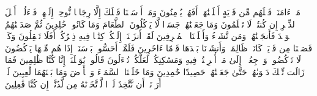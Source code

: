 \stopbuffer%
\startbuffer[\q:21:6]
مَاۤ ءَامَنَتۡ قَبۡلَهُم مِّن قَرۡیَةٍ أَهۡلَكۡنَٰهَاۤۖ أَفَهُمۡ یُؤۡمِنُونَ%
\stopbuffer%
\startbuffer[\q:21:7]
وَمَاۤ أَرۡسَلۡنَا قَبۡلَكَ إِلَّا رِجَالࣰا نُّوحِیۤ إِلَیۡهِمۡۖ فَسۡءَلُوۤا۟ أَهۡلَ ٱلذِّكۡرِ إِن كُنتُمۡ لَا تَعۡلَمُونَ%
\stopbuffer%
\startbuffer[\q:21:8]
وَمَا جَعَلۡنَٰهُمۡ جَسَدࣰا لَّا یَأۡكُلُونَ ٱلطَّعَامَ وَمَا كَانُوا۟ خَٰلِدِینَ%
\stopbuffer%
\startbuffer[\q:21:9]
ثُمَّ صَدَقۡنَٰهُمُ ٱلۡوَعۡدَ فَأَنجَیۡنَٰهُمۡ وَمَن نَّشَاۤءُ وَأَهۡلَكۡنَا ٱلۡمُسۡرِفِینَ%
\stopbuffer%
\startbuffer[\q:21:10]
لَقَدۡ أَنزَلۡنَاۤ إِلَیۡكُمۡ كِتَٰبࣰا فِیهِ ذِكۡرُكُمۡۚ أَفَلَا تَعۡقِلُونَ%
\stopbuffer%
\startbuffer[\q:21:11]
وَكَمۡ قَصَمۡنَا مِن قَرۡیَةࣲ كَانَتۡ ظَالِمَةࣰ وَأَنشَأۡنَا بَعۡدَهَا قَوۡمًا ءَاخَرِینَ%
\stopbuffer%
\startbuffer[\q:21:12]
فَلَمَّاۤ أَحَسُّوا۟ بَأۡسَنَاۤ إِذَا هُم مِّنۡهَا یَرۡكُضُونَ%
\stopbuffer%
\startbuffer[\q:21:13]
لَا تَرۡكُضُوا۟ وَٱرۡجِعُوۤا۟ إِلَىٰ مَاۤ أُتۡرِفۡتُمۡ فِیهِ وَمَسَٰكِنِكُمۡ لَعَلَّكُمۡ تُسۡءَلُونَ%
\stopbuffer%
\startbuffer[\q:21:14]
قَالُوا۟ یَٰوَیۡلَنَاۤ إِنَّا كُنَّا ظَٰلِمِینَ%
\stopbuffer%
\startbuffer[\q:21:15]
فَمَا زَالَت تِّلۡكَ دَعۡوَىٰهُمۡ حَتَّىٰ جَعَلۡنَٰهُمۡ حَصِیدًا خَٰمِدِینَ%
\stopbuffer%
\startbuffer[\q:21:16]
وَمَا خَلَقۡنَا ٱلسَّمَاۤءَ وَٱلۡأَرۡضَ وَمَا بَیۡنَهُمَا لَٰعِبِینَ%
\stopbuffer%
\startbuffer[\q:21:17]
لَوۡ أَرَدۡنَاۤ أَن نَّتَّخِذَ لَهۡوࣰا لَّٱتَّخَذۡنَٰهُ مِن لَّدُنَّاۤ إِن كُنَّا فَٰعِلِینَ%
\stopbuffer%
